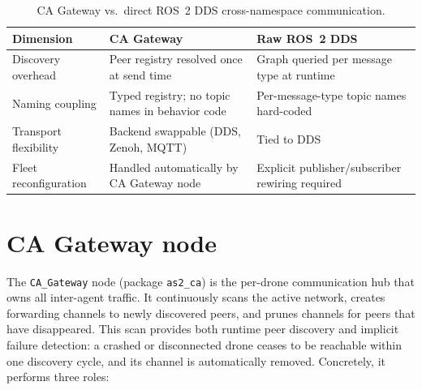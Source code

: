 \documentclass[deliverable]{csreport}
\renewcommand{\code}[1]{\texttt{\textcolor{CSMaroon}{#1}}}%
\begin{document}
\begin{table}[tbh]
\caption{CA Gateway vs.\ direct ROS~2 DDS cross-namespace communication.}
\label{tab:gateway_vs_dds}
\centering
\renewcommand{\arraystretch}{1.2}
\begin{tabular}{p{3.2cm}p{4.0cm}p{4.0cm}}
\hline
\textbf{Dimension} & \textbf{CA Gateway} & \textbf{Raw ROS~2 DDS} \\
\hline
Discovery overhead & Peer registry resolved once at send time & Graph queried per message type at runtime \\
Naming coupling & Typed registry; no topic names in behavior code & Per-message-type topic names hard-coded \\
Transport flexibility & Backend swappable (DDS, Zenoh, MQTT) & Tied to DDS \\
Fleet reconfiguration & Handled automatically by CA Gateway node & Explicit publisher/subscriber rewiring required \\
\hline
\end{tabular}
\end{table}

\section{CA Gateway node}

The \code{CA\_Gateway} node (package \code{as2\_ca}) is the per-drone communication hub that owns all inter-agent traffic. It continuously scans the active network, creates forwarding channels to newly discovered peers, and prunes channels for peers that have disappeared. This scan provides both runtime peer discovery and implicit failure detection: a crashed or disconnected drone ceases to be reachable within one discovery cycle, and its channel is automatically removed. Concretely, it performs three roles:
\end{document}
